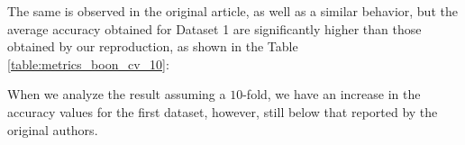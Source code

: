 The same is observed in the original article, as well as a similar behavior, but the average accuracy obtained for Dataset 1 are significantly higher than those obtained by our reproduction, as shown in the Table \ref{table:metrics_boon_cv_10}:



When we analyze the result assuming a $10$-fold, we have an increase in the accuracy values for the first dataset, however, still below that reported by the original authors.

